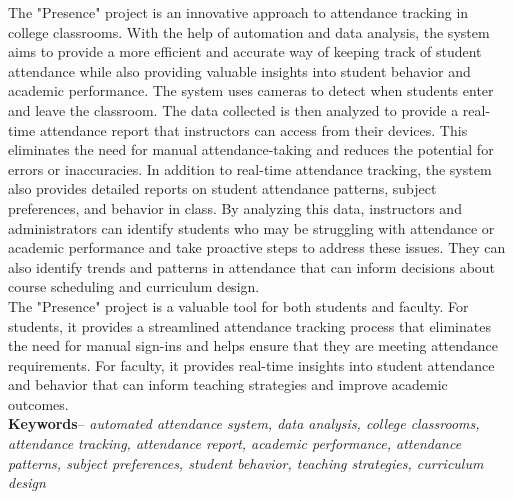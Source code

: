 The "Presence" project is an innovative approach to attendance tracking in college classrooms. With the help of automation and data analysis, the system aims to provide a more efficient and accurate way of keeping track of student attendance while also providing valuable insights into student behavior and academic performance. The system uses cameras to detect when students enter and leave the classroom. The data collected is then analyzed to provide a real-time attendance report that instructors can access from their devices. This eliminates the need for manual attendance-taking and reduces the potential for errors or inaccuracies. In addition to real-time attendance tracking, the system also provides detailed reports on student attendance patterns, subject preferences, and behavior in class. By analyzing this data, instructors and administrators can identify students who may be struggling with attendance or academic performance and take proactive steps to address these issues. They can also identify trends and patterns in attendance that can inform decisions about course scheduling and curriculum design.\\

The "Presence" project is a valuable tool for both students and faculty. For students, it provides a streamlined attendance tracking process that eliminates the need for manual sign-ins and helps ensure that they are meeting attendance requirements. For faculty, it provides real-time insights into student attendance and behavior that can inform teaching strategies and improve academic outcomes.\\ 

\textbf{Keywords}--
\textit{ automated attendance system, data analysis, college classrooms, attendance tracking, attendance report, academic performance, attendance patterns, subject preferences, student behavior, teaching strategies, curriculum design }